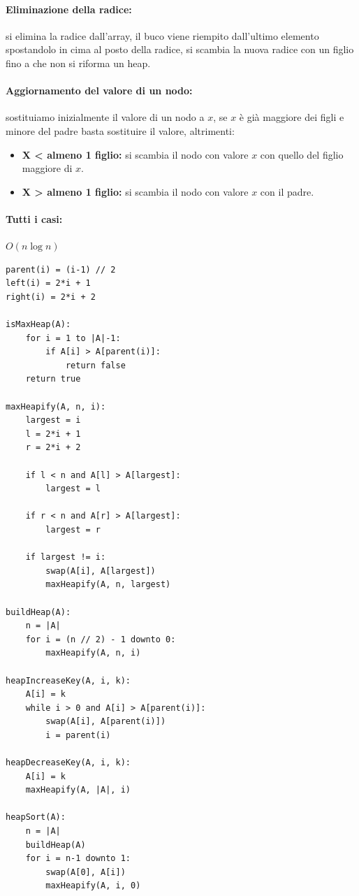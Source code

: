 \documentclass[a4paper,12pt]{article}
\begin{document}
\paragraph{Eliminazione della radice:} si elimina la radice dall'array, il buco viene riempito dall'ultimo elemento spostandolo in cima al posto della radice,
si scambia la nuova radice con un figlio fino a che non si riforma un heap.
\paragraph{Aggiornamento del valore di un nodo:} sostituiamo inizialmente il valore di un nodo a $x$, se $x$ è già maggiore dei figli e minore del padre basta sostituire il valore, altrimenti:
\begin{itemize}
  \item \textbf{X < almeno 1 figlio:} si scambia il nodo con valore $x$ con quello del figlio maggiore di $x$.
  \item \textbf{X > almeno 1 figlio:} si scambia il nodo con valore $x$ con il padre.
\end{itemize}

\paragraph{Tutti i casi:} $O(n \log n)$
\begin{lstlisting}
parent(i) = (i-1) // 2
left(i) = 2*i + 1
right(i) = 2*i + 2

isMaxHeap(A):
    for i = 1 to |A|-1:
        if A[i] > A[parent(i)]:
            return false
    return true

maxHeapify(A, n, i):
    largest = i
    l = 2*i + 1
    r = 2*i + 2

    if l < n and A[l] > A[largest]:
        largest = l

    if r < n and A[r] > A[largest]:
        largest = r

    if largest != i:
        swap(A[i], A[largest])
        maxHeapify(A, n, largest)

buildHeap(A):
    n = |A|
    for i = (n // 2) - 1 downto 0:
        maxHeapify(A, n, i)

heapIncreaseKey(A, i, k):
    A[i] = k
    while i > 0 and A[i] > A[parent(i)]:
        swap(A[i], A[parent(i)])
        i = parent(i)

heapDecreaseKey(A, i, k):
    A[i] = k
    maxHeapify(A, |A|, i)

heapSort(A):
    n = |A|
    buildHeap(A)
    for i = n-1 downto 1:
        swap(A[0], A[i])
        maxHeapify(A, i, 0)
    
\end{lstlisting}
\end{document}

